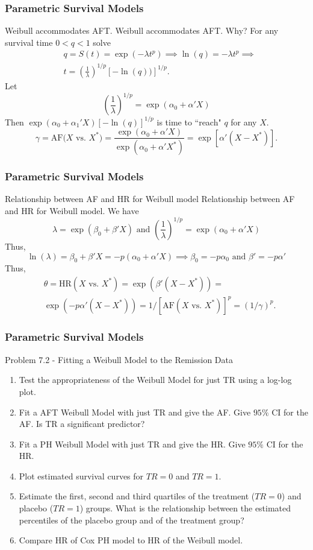 \documentclass{beamer}
\theoremstyle{definition}
\begin{document}
\begin{frame}
\frametitle{Parametric Survival Models}
\begin{block}{Weibull accommodates AFT.}
Weibull accommodates AFT. Why? For any survival time $0 < q < 1$ solve
\begin{align*}
& q = S(t) =  \exp(-\lambda t^p) \implies \ln(q) = - \lambda t^p \implies \\
& t = \left(\frac{1}{\lambda}\right)^{1/p} [- \ln(q))]^{1/p}.
\end{align*}
Let
\[
\left(\frac{1}{\lambda}\right)^{1/p} = \exp(\alpha_0 + \alpha'X)
\]
Then $\exp(\alpha_0 + \alpha_1'X)[- \ln(q)]^{1/p}$ is time to ``reach" $q$ for any $X$.
\vspace{-10pt}
\[
\gamma = \text{AF($X$ vs. $X^*$)} = \frac{\exp(\alpha_0 + \alpha'X)}{\exp(\alpha_0 + \alpha'X^*)} = \exp[\alpha'(X-X^*)].
\]
\end{block}
\end{frame}

\begin{frame}
\frametitle{Parametric Survival Models}
\begin{block}{Relationship between AF and HR for Weibull model}
Relationship between AF and HR for Weibull model. We have
\[
\lambda = \exp(\beta_0 + \beta'X) \text{ and } \left(\frac{1}{\lambda}\right)^{1/p} = \exp(\alpha_0 + \alpha'X)
\]
Thus,
\[ \ln(\lambda) = \beta_0 + \beta'X = -p(\alpha_0 + \alpha'X) \implies \beta_0 = -p\alpha_0 \text{ and } \beta'=-p\alpha' \]
Thus,
\begin{align*}
&\theta = \text{HR}(X \text{ vs. } X^*) = \exp(\beta'(X - X^*)) =\\
&\exp(-p\alpha'(X - X^*)) = 1/[\text{AF}(X \text{ vs. } X^*)]^p = (1/\gamma)^p.
\end{align*}
\end{block}
\end{frame}

\begin{frame}
\frametitle{Parametric Survival Models}
\begin{block}{Problem 7.2 - Fitting a Weibull Model to the Remission Data}
\begin{enumerate}
\item Test the appropriateness of the Weibull Model for just TR using a log-log plot.
\item Fit a AFT Weibull Model with just TR and give the AF. Give $95\%$ CI for the AF. Is TR a significant predictor?
\item Fit a PH  Weibull Model with just TR and give the HR. Give $95\%$ CI for the HR.
\item Plot estimated survival curves for $TR=0$ and $TR=1$.
\item Estimate the first, second and third quartiles of the treatment ($TR=0$) and placebo ($TR=1$) groups. What is the relationship between the estimated percentiles of the placebo group and of the treatment group?
\item Compare HR of Cox PH model to HR of the Weibull model.
\end{enumerate}
\end{block}
\end{frame}
\end{document}
